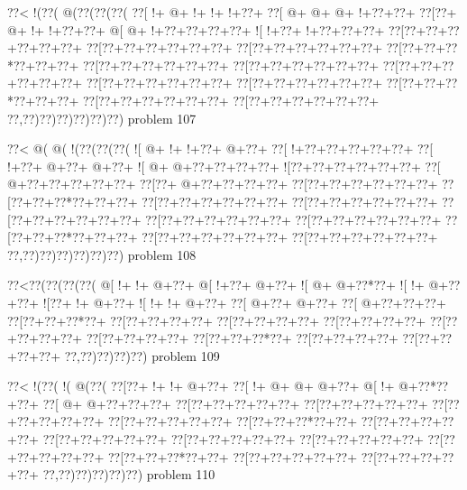 \vbox{\vbox{\goo
\0??<\- !(\0??(\- @(\0??(\0??(\0??(
\0??[\- !+\- @+\- !+\- !+\- !+\0??+
\0??[\- @+\- @+\- @+\- !+\0??+\0??+
\0??[\0??+\- @+\- !+\- !+\0??+\0??+
\- @[\- @+\- !+\0??+\0??+\0??+\0??+
\- ![\- !+\0??+\- !+\0??+\0??+\0??+
\0??[\0??+\0??+\0??+\0??+\0??+\0??+
\0??[\0??+\0??+\0??+\0??+\0??+\0??+
\0??[\0??+\0??+\0??+\0??+\0??+\0??+
\0??[\0??+\0??+\0??*\0??+\0??+\0??+
\0??[\0??+\0??+\0??+\0??+\0??+\0??+
\0??[\0??+\0??+\0??+\0??+\0??+\0??+
\0??[\0??+\0??+\0??+\0??+\0??+\0??+
\0??[\0??+\0??+\0??+\0??+\0??+\0??+
\0??[\0??+\0??+\0??+\0??+\0??+\0??+
\0??[\0??+\0??+\0??*\0??+\0??+\0??+
\0??[\0??+\0??+\0??+\0??+\0??+\0??+
\0??[\0??+\0??+\0??+\0??+\0??+\0??+
\0??,\0??)\0??)\0??)\0??)\0??)\0??)
}
\hfil problem 107\hfil\break
}

\vbox{\vbox{\goo
\0??<\- @(\- @(\- !(\0??(\0??(\0??(
\- ![\- @+\- !+\- !+\0??+\- @+\0??+
\0??[\- !+\0??+\0??+\0??+\0??+\0??+
\0??[\- !+\0??+\- @+\0??+\- @+\0??+
\- ![\- @+\- @+\0??+\0??+\0??+\0??+
\- ![\0??+\0??+\0??+\0??+\0??+\0??+
\0??[\- @+\0??+\0??+\0??+\0??+\0??+
\0??[\0??+\- @+\0??+\0??+\0??+\0??+
\0??[\0??+\0??+\0??+\0??+\0??+\0??+
\0??[\0??+\0??+\0??*\0??+\0??+\0??+
\0??[\0??+\0??+\0??+\0??+\0??+\0??+
\0??[\0??+\0??+\0??+\0??+\0??+\0??+
\0??[\0??+\0??+\0??+\0??+\0??+\0??+
\0??[\0??+\0??+\0??+\0??+\0??+\0??+
\0??[\0??+\0??+\0??+\0??+\0??+\0??+
\0??[\0??+\0??+\0??*\0??+\0??+\0??+
\0??[\0??+\0??+\0??+\0??+\0??+\0??+
\0??[\0??+\0??+\0??+\0??+\0??+\0??+
\0??,\0??)\0??)\0??)\0??)\0??)\0??)
}
\hfil problem 108\hfil\break
}

\vbox{\vbox{\goo
\0??<\0??(\0??(\0??(\0??(
\- @[\- !+\- !+\- @+\0??+
\- @[\- !+\0??+\- @+\0??+
\- ![\- @+\- @+\0??*\0??+
\- ![\- !+\- @+\0??+\0??+
\- ![\0??+\- !+\- @+\0??+
\- ![\- !+\- !+\- @+\0??+
\0??[\- @+\0??+\- @+\0??+
\0??[\- @+\0??+\0??+\0??+
\0??[\0??+\0??+\0??*\0??+
\0??[\0??+\0??+\0??+\0??+
\0??[\0??+\0??+\0??+\0??+
\0??[\0??+\0??+\0??+\0??+
\0??[\0??+\0??+\0??+\0??+
\0??[\0??+\0??+\0??+\0??+
\0??[\0??+\0??+\0??*\0??+
\0??[\0??+\0??+\0??+\0??+
\0??[\0??+\0??+\0??+\0??+
\0??,\0??)\0??)\0??)\0??)
}
\hfil problem 109\hfil\break
}

\vbox{\vbox{\goo
\0??<\- !(\0??(\- !(\- @(\0??(
\0??[\0??+\- !+\- !+\- @+\0??+
\0??[\- !+\- @+\- @+\- @+\0??+
\- @[\- !+\- @+\0??*\0??+\0??+
\0??[\- @+\- @+\0??+\0??+\0??+
\0??[\0??+\0??+\0??+\0??+\0??+
\0??[\0??+\0??+\0??+\0??+\0??+
\0??[\0??+\0??+\0??+\0??+\0??+
\0??[\0??+\0??+\0??+\0??+\0??+
\0??[\0??+\0??+\0??*\0??+\0??+
\0??[\0??+\0??+\0??+\0??+\0??+
\0??[\0??+\0??+\0??+\0??+\0??+
\0??[\0??+\0??+\0??+\0??+\0??+
\0??[\0??+\0??+\0??+\0??+\0??+
\0??[\0??+\0??+\0??+\0??+\0??+
\0??[\0??+\0??+\0??*\0??+\0??+
\0??[\0??+\0??+\0??+\0??+\0??+
\0??[\0??+\0??+\0??+\0??+\0??+
\0??,\0??)\0??)\0??)\0??)\0??)
}
\hfil problem 110\hfil\break
}

